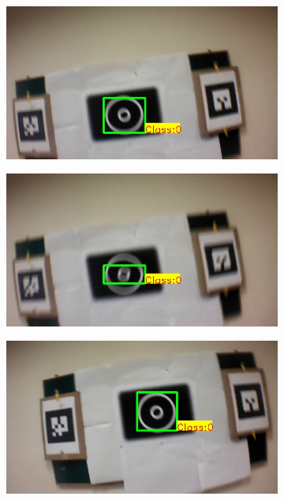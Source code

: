 \documentclass[runningheads]{llncs}
\begin{document}
\begin{figure}
\begin{subfigure}[b]{.19\textwidth}
\end{subfigure}
\begin{subfigure}[b]{.19\textwidth}
\includegraphics[width=\linewidth]{BLUT_input_00/output3.jpg}
\end{subfigure}
\begin{subfigure}[b]{.19\textwidth}
\includegraphics[width=\linewidth]{BLUT_input_00/output4.jpg}
\end{subfigure}
\begin{subfigure}[b]{.19\textwidth}
\includegraphics[width=\linewidth]{BLUT_input_00/output5.jpg}

\end{subfigure}
\end{figure}
\end{document}
